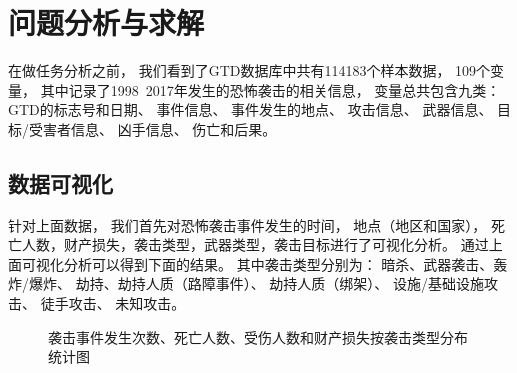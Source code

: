 \documentclass[bwprint]{gmcmthesis}
\begin{document}
\section{问题分析与求解}

在做任务分析之前，
我们看到了GTD数据库中共有114183个样本数据，
109个变量，
其中记录了1998~2017年发生的恐怖袭击的相关信息，
变量总共包含九类：
GTD的标志号和日期、
事件信息、
事件发生的地点、
攻击信息、
武器信息、
目标/受害者信息、
凶手信息、
伤亡和后果。

\subsection{数据可视化}

针对上面数据，
我们首先对恐怖袭击事件发生的时间，
地点（地区和国家），
死亡人数，财产损失，袭击类型，武器类型，袭击目标进行了可视化分析。
通过上面可视化分析可以得到下面的结果。
其中袭击类型分别为：
暗杀、武器袭击、轰炸/爆炸、
劫持、劫持人质（路障事件）、
劫持人质（绑架）、
设施/基础设施攻击、
徒手攻击、
未知攻击。

\begin{figure}[htbp]
    \caption{袭击事件发生次数、死亡人数、受伤人数和财产损失按袭击类型分布统计图}
    \label{tab:袭击类型}
\end{figure}
\end{document}
